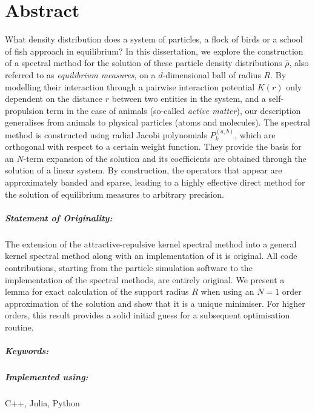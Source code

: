 \chapter*{Abstract}
\label{chap:abstract}
What density distribution does a system of particles, a flock of birds or a school of fish approach in equilibrium?
In this dissertation, we explore the construction of a spectral method for the solution of these particle density distributions $\hat{\rho}$, also referred to as \textit{equilibrium measures}, on a $d$-dimensional ball of radius $R$.
By modelling their interaction through a pairwise interaction potential $K(r)$ only dependent on the distance $r$ between two entities in the system, and a self-propulsion term in the case of animals (so-called \textit{active matter}), our description generalises from animals to physical particles (atoms and molecules).
The spectral method is constructed using radial Jacobi polynomials $P_k^{(a,b)}$, which are orthogonal with respect to a certain weight function.
They provide the basis for an $N$-term expansion of the solution and its coefficients are obtained through the solution of a linear system.
By construction, the operators that appear are approximately banded and sparse, leading to a highly effective direct method for the solution of equilibrium measures to arbitrary precision.

\paragraph{Statement of Originality:}
The extension of the attractive-repulsive kernel spectral method into a general kernel spectral method along with an implementation of it is original.
All code contributions, starting from the particle simulation software to the implementation of the spectral methods, are entirely original.
We present a lemma for exact calculation of the support radius $R$ when using an $N = 1$ order approximation of the solution and show that it is a unique minimiser.
For higher orders, this result provides a solid initial guess for a subsequent optimisation routine.

\paragraph{Keywords:}
\thesiskeywords

\paragraph{Implemented using:}
C++, Julia, Python
